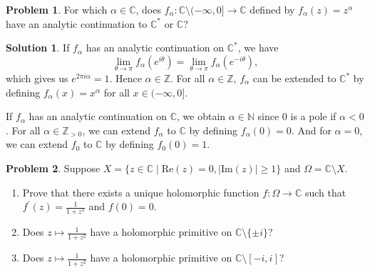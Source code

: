 \documentclass{article}
\theoremstyle{definition}
\newtheorem{problem}{Problem}
\newtheorem{solution}{Solution}
\newcommand{\N}{\mathbb{N}}
\newcommand{\C}{\mathbb{C}}
\newcommand{\Z}{\mathbb{Z}}
\newcommand{\re}{\mathrm{Re}}
\newcommand{\im}{\mathrm{Im}}
\renewcommand{\geq}{\geqslant}
\begin{document}
\begin{problem}
    For which $\alpha\in\C$, does $f_\alpha\colon \C\setminus (-\infty,0]\to \C$ defined by $f_\alpha(z)=z^\alpha$ have an analytic continuation to $\C^{*}$ or $\C$?
\end{problem}
\begin{solution}
    If $f_\alpha$ has an analytic continuation on $\C^{*}$, we have 
    \begin{equation*}
        \lim_{\theta\rightarrow\pi}f_\alpha(e^{i\theta})= \lim_{\theta\rightarrow \pi}f_\alpha(e^{-i\theta}),
    \end{equation*}
    which gives us $e^{2\pi i\alpha}=1$. Hence $\alpha\in\Z$. For all $\alpha\in \Z$, $f_\alpha$ can be extended to $\C^{*}$ by defining $f_\alpha(x)=x^{\alpha}$ for all $x\in (-\infty,0]$.

    If $f_\alpha$ has an analytic continuation on $\C$, we obtain $\alpha\in\N$ since $0$ is a pole if $\alpha<0$. For all $\alpha\in \Z_{>0}$, we can extend $f_\alpha$ to $\C$ by defining $f_\alpha(0)=0$. And for $\alpha=0$, we can extend $f_0$ to $\C$ by defining $f_0(0)=1$.
\end{solution}
\begin{problem}
    Suppose $X=\{z\in \C\mid \re(z)=0,|\im(z)|\geq 1\}$ and $\Omega=\C\setminus X$.
    \begin{enumerate}
        \item[(a)] Prove that there exists a unique holomorphic function $f\colon \Omega\to \C$ such that $f^{\prime}(z)=\frac{1}{1+z^2}$ and $f(0)=0$.
        \item[(b)] Does $z\mapsto \frac{1}{1+z^2}$ have a holomorphic primitive on $\C\setminus \{\pm i\}$?
        \item[(c)] Does $z\mapsto \frac{1}{1+z^2}$ have a holomorphic primitive on $\C\setminus [-i,i]$?
    \end{enumerate} 
\end{problem}
\end{document}
